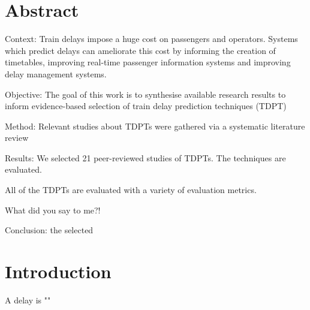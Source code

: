 \documentclass[a4paper]{article}
\begin{document}
\section*{} 

\section*{} 
\section*{} 

\section*{Abstract}

Context: Train delays impose a huge cost on passengers and operators. Systems which predict 
delays can ameliorate this cost by informing the creation of timetables, improving real-time
passenger information systems and improving delay management systems. 

Objective: The goal of this work is to synthesise available research results to inform
evidence-based selection of train delay prediction techniques (TDPT)

Method: Relevant studies about TDPTs were gathered via a systematic literature review

Results: We selected 21 peer-reviewed studies of TDPTs. The techniques are evaluated.

All of the TDPTs are evaluated with a variety of evaluation metrics.

What did you say to me?! ~\cite{armstrong_preston_2017}


Conclusion: the selected 

\section{Introduction}

A delay is "" 




{}

\end{document}
